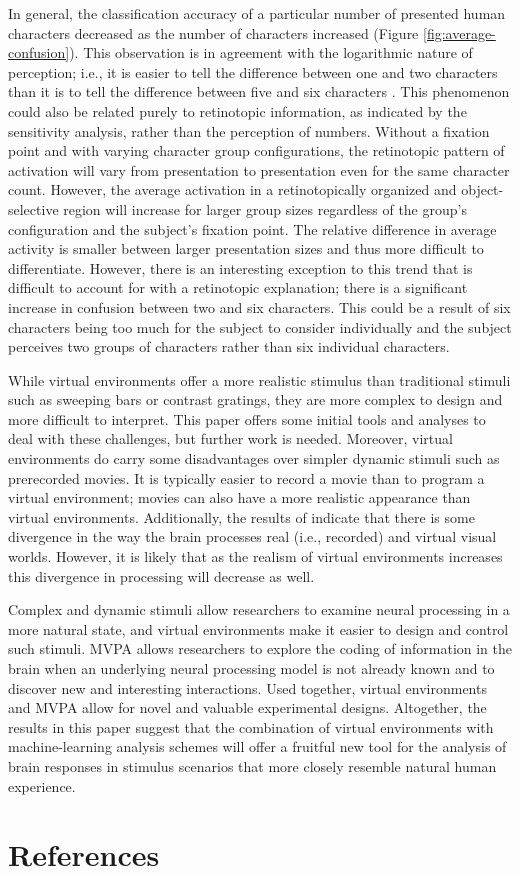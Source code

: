 \documentclass[5p,authoryear]{elsarticle}
\begin{document}
In general, the classification accuracy of a particular number of presented human characters decreased as the number of characters increased (Figure \ref{fig:average-confusion}).
This observation is in agreement with the logarithmic nature of perception; i.e., it is easier to tell the difference between one and two characters than it is to tell the difference between five and six characters \citep{Shepard1975,Dehaene2003}.
This phenomenon could also be related purely to retinotopic information, as indicated by the sensitivity analysis, rather than the perception of numbers.
Without a fixation point and with varying character group configurations, the retinotopic pattern of activation will vary from presentation to presentation even for the same character count.
However, the average activation in a retinotopically organized and object-selective region will increase for larger group sizes regardless of the group's configuration and the subject's fixation point.
The relative difference in average activity is smaller between larger presentation sizes and thus more difficult to differentiate.
However, there is an interesting exception to this trend that is difficult to account for with a retinotopic explanation; there is a significant increase in confusion between two and six characters.
This could be a result of six characters being too much for the subject to consider individually and the subject perceives two groups of characters rather than six individual characters.

While virtual environments offer a more realistic stimulus than traditional stimuli such as sweeping bars or contrast gratings, they are more complex to design and more difficult to interpret.
This paper offers some initial tools and analyses to deal with these challenges, but further work is needed.
Moreover, virtual environments do carry some disadvantages over simpler dynamic stimuli such as prerecorded movies. 
It is typically easier to record a movie than to program a virtual environment; movies can also have a more realistic appearance than virtual environments.
Additionally, the results of \cite{Han2005} indicate that there is some divergence in the way the brain processes real (i.e., recorded) and virtual visual worlds. 
However, it is likely that as the realism of virtual environments increases this divergence in processing will decrease as well.

Complex and dynamic stimuli allow researchers to examine neural processing in a more natural state, and virtual environments make it easier to design and control such stimuli.
MVPA allows researchers to explore the coding of information in the brain when an underlying neural processing model is not already known and to discover new and interesting interactions.
Used together, virtual environments and MVPA allow for novel and valuable experimental designs.
Altogether, the results in this paper suggest that the combination of virtual environments with machine-learning analysis schemes will offer a fruitful new tool for the analysis of brain responses in stimulus scenarios that more closely resemble natural human experience.

\section{References}

\end{document}
